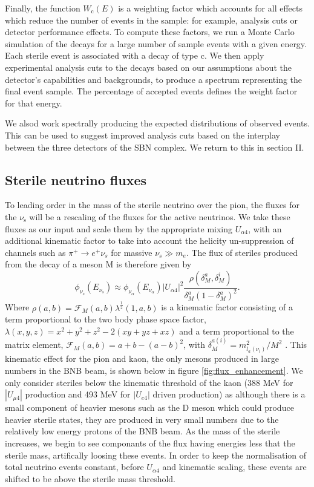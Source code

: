 \documentclass[11pt, a4paper]{article}
\begin{document}
%
Finally, the function $W_\text{c}(E)$ is a weighting factor which accounts for
all effects which reduce the number of events in the sample: for example,
analysis cuts or detector performance effects.
%
To compute these factors, we run a Monte Carlo simulation of the decays for a
large number of sample events with a given energy. Each sterile event is
associated with a decay of type $\text{c}$. We then apply experimental analysis
cuts to the decays based on our assumptions about the detector's capabilities
and backgrounds, to produce a spectrum representing the final event sample. The
percentage of accepted events defines the weight factor for that energy.

We alsod work spectrally producing the expected distributions of observed
events. This can be used to suggest improved analysis cuts based on the
interplay between the three detectors of the SBN complex. We return to this in
section II.

\subsection{Sterile neutrino fluxes}

To leading order in the mass of the sterile neutrino over the pion, the fluxes
for the $\nu_\text{s}$ will be a rescaling of the fluxes for the active
neutrinos.  We take these fluxes as our input and scale them by the appropriate mixing $U_{\alpha 4}$, with an additional kinematic factor to take into account the helicity un-suppression of channels such as $\pi^+ \rightarrow e^+\nu_s$ for massive $\nu_s \gg m_e$. The flux of steriles produced from the decay of a meson M is therefore given by
\[
	\phi_{\nu_s}(E_{\nu_s}) \approx \phi_{\nu_\alpha} (E_{\nu_\alpha})\vert U_{\alpha 4}\vert^2 \frac{\rho\left( \delta_M^a , \delta_M^i \right)}{\delta_M^a \left(1- \delta_M^a\right)^2}.
\]
Where $\rho(a,b)=\mathcal{F}_M(a,b) \lambda^{\frac{1}{2}}(1,a,b)$ is a kinematic factor consisting of a term proportional to the two body phase space factor, $\lambda(x,y,z)=x^2+y^2+z^2-2(x y+yz+x z)$ and a term proportional to the matrix element, $\mathcal{F}_M(a,b)= a+b -\left(a-b\right)^2$, with $\delta_M^{a(i)}=m_{l_a(\nu_i)}^2/M^2$ \cite{PhysRevD.24.1232}. This kinematic effect for the pion and kaon, the only mesons produced in large numbers in the BNB beam, is shown below in figure \ref{fig:flux_enhancement}. We only consider steriles below the kinematic threshold of the kaon (388 MeV for $|U_{\mu4}|$ production and 493 MeV for $|U_{e4}|$ driven production) as although there is a small component of heavier mesons such as the D meson which could produce heavier sterile states, they are produced in very small numbers due to the relatively low energy protons of the BNB beam. As the mass of the sterile increases, we begin to see componants of the flux having energies less that the sterile mass, artifically loosing these events. In order to keep the normalisation of total neutrino events constant, before $U_{\alpha 4}$ and kinematic scaling, these events are shifted to be above the sterile mass threshold. \\
\end{document}
